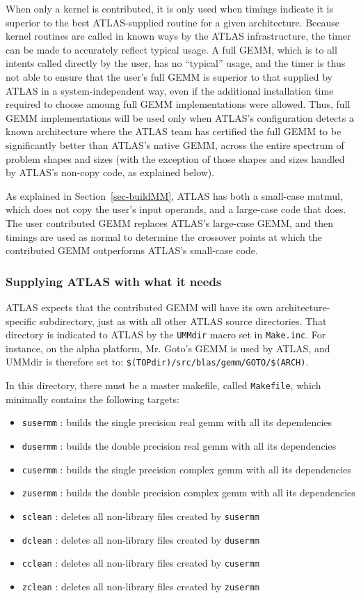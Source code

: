 \documentclass[11pt]{article}
\begin{document}
When only a kernel is contributed, it is only used when timings indicate
it is superior to the best ATLAS-supplied routine for a given architecture.
Because kernel routines are called in known ways by the ATLAS infrastructure,
the timer can be made to accurately reflect typical usage.  A full GEMM,
which is to all intents called directly by the user, has no ``typical''
usage, and the timer is thus not able to ensure that the user's full
GEMM is superior to that supplied by ATLAS in a system-independent way,
even if the additional installation time required to choose amoung full
GEMM implementations were allowed.  Thus, full GEMM implementations will
be used only when ATLAS's configuration detects a known architecture where
the ATLAS team has certified the full GEMM to be significantly better than
ATLAS's native GEMM, across the entire spectrum of problem shapes and sizes
(with the exception of those shapes and sizes handled by ATLAS's non-copy
code, as explained below).

As explained in Section~\ref{sec-buildMM}, ATLAS has both a small-case
matmul, which does not copy the user's input operands, and a large-case
code that does.  The user contributed GEMM replaces ATLAS's large-case
GEMM, and then timings are used as normal to determine the crossover points at
which the contributed GEMM outperforms ATLAS's small-case code.

\subsubsection{Supplying ATLAS with what it needs}
ATLAS expects that the contributed GEMM will have its own architecture-
specific subdirectory, just as with all other ATLAS source directories.
That directory is indicated to ATLAS by the {\tt UMMdir} macro set in
{\tt Make.inc}.  For instance, on the alpha platform, Mr. Goto's GEMM
is used by ATLAS, and {UMMdir} is therefore set to:
{\tt \$(TOPdir)/src/blas/gemm/GOTO/\$(ARCH)}.

In this directory, there must be a master makefile, called {\tt Makefile},
which minimally contains the following targets:
\begin{itemize}
\item {\tt susermm} : builds the single precision real gemm with
all its dependencies
\item {\tt dusermm} : builds the double precision real gemm with
all its dependencies
\item {\tt cusermm} : builds the single precision complex gemm with
all its dependencies
\item {\tt zusermm} : builds the double precision complex gemm with
all its dependencies
\item {\tt sclean} : deletes all non-library files created by {\tt susermm}
\item {\tt dclean} : deletes all non-library files created by {\tt dusermm}
\item {\tt cclean} : deletes all non-library files created by {\tt cusermm}
\item {\tt zclean} : deletes all non-library files created by {\tt zusermm}
\end{itemize}
\end{document}
